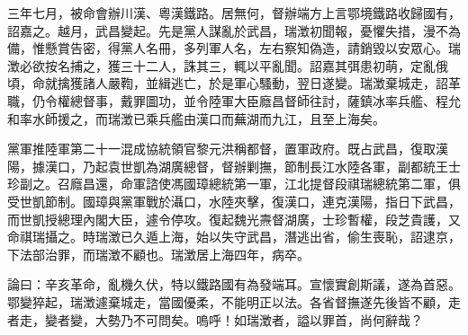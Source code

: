 \begin{pinyinscope}
三年七月，被命會辦川漢、粵漢鐵路。居無何，督辦端方上言鄂境鐵路收歸國有，詔嘉之。越月，武昌變起。先是黨人謀亂於武昌，瑞澂初聞報，憂懼失措，漫不為備，惟懸賞告密，得黨人名冊，多列軍人名，左右察知偽造，請銷毀以安眾心。瑞澂必欲按名捕之，獲三十二人，誅其三，輒以平亂聞。詔嘉其弭患初萌，定亂俄頃，命就擒獲諸人嚴鞫，並緝逃亡，於是軍心騷動，翌日遂變。瑞澂棄城走，詔革職，仍令權總督事，戴罪圖功，並令陸軍大臣廕昌督師往討，薩鎮冰率兵艦、程允和率水師援之，而瑞澂已乘兵艦由漢口而蕪湖而九江，且至上海矣。

黨軍推陸軍第二十一混成協統領官黎元洪稱都督，置軍政府。既占武昌，復取漢陽，據漢口，乃起袁世凱為湖廣總督，督辦剿撫，節制長江水陸各軍，副都統王士珍副之。召廕昌還，命軍諮使馮國璋總統第一軍，江北提督段祺瑞總統第二軍，俱受世凱節制。國璋與黨軍戰於灄口，水陸夾擊，復漢口，連克漢陽，指日下武昌，而世凱授總理內閣大臣，遽令停攻。復起魏光燾督湖廣，士珍暫權，段芝貴護，又命祺瑞攝之。時瑞澂已久遁上海，始以失守武昌，潛逃出省，偷生喪恥，詔逮京，下法部治罪，而瑞澂不顧也。瑞澂居上海四年，病卒。

論曰：辛亥革命，亂機久伏，特以鐵路國有為發端耳。宣懷實創斯議，遂為首惡。鄂變猝起，瑞澂遽棄城走，當國優柔，不能明正以法。各省督撫遂先後皆不顧，走者走，變者變，大勢乃不可問矣。嗚呼！如瑞澂者，謚以罪首，尚何辭哉？


\end{pinyinscope}